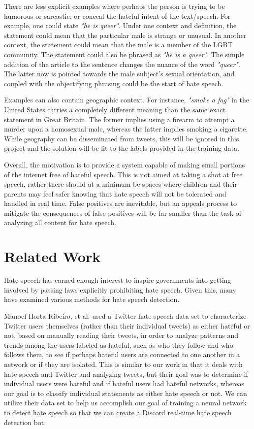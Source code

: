 \documentclass[conference]{sig-alternate-05-2015}
\begin{document}
There are less explicit examples where perhaps the person is trying to be humorous or sarcastic, or conceal the hateful intent of the text/speech.  For example, one could state \textit{"he is queer"}.  Under one context and definition, the statement could mean that the particular male is strange or unusual.  In another context, the statement could mean that the male is a member of the LGBT community. The statement could also be phrased as \textit{"he is a queer"}.  The simple addition of the article to the sentence changes the nuance of the word \textit{"queer"}.  The latter now is pointed towards the male subject's sexual orientation, and coupled with the objectifying phrasing could be the start of hate speech.

Examples can also contain geographic context.  For instance, \textit{"smoke a fag"} in the United States carries a completely different meaning than the same exact statement in Great Britain.  The former implies using a firearm to attempt a murder upon a homosexual male, whereas the latter implies smoking a cigarette.  While geography can be disseminated from tweets, this will be ignored in this project and the solution will be fit to the labels provided in the training data.

Overall, the motivation is to provide a system capable of making small portions of the internet free of hateful speech.  This is not aimed at taking a shot at free speech, rather there should at a minimum be spaces where children and their parents may feel safer knowing that hate speech will not be tolerated and handled in real time.  False positives are inevitable, but an appeals process to mitigate the consequences of false positives will be far smaller than the task of analyzing all content for hate speech.

\section{Related Work}\label{sec:related}

Hate speech has earned enough interest to inspire governments into getting involved\cite{Davidsonetal.} by passing laws explicitly prohibiting hate speech.  Given this, many have examined various methods for hate speech detection.

Manoel Horta Ribeiro, et al.\cite{HatefulUsersTwitter}\cite{ribeiro2017like} used a Twitter hate speech data set to characterize Twitter users themselves (rather than their individual tweets) as either hateful or not, based on manually reading their tweets, in order to analyze patterns and trends among the users labeled as hateful, such as who they follow and who follows them, to see if perhaps hateful users are connected to one another in a network or if they are isolated. This is similar to our work in that it deals with hate speech and Twitter and analyzing tweets, but their goal was to determine if individual users were hateful and if hateful users had hateful networks, whereas our goal is to classify individual statements as either hate speech or not. We can utilize their data set to help us accomplish our goal of training a neural network to detect hate speech so that we can create a Discord real-time hate speech detection bot.
\end{document}
